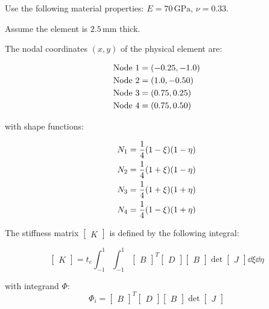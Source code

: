 \documentclass[../main.tex]{subfiles}
\begin{document}
Use the following material properties: \(E=70\,\unit{\giga\pascal}\), \(\nu=0.33\).

Assume the element is \(2.5 \, \unit{\milli\meter}\) thick.

The nodal coordinates \((x,y)\) of the physical element are:

\begin{align*}
    \centering
    \textrm{Node 1} &= (-0.25,-1.0)\\
    \textrm{Node 2} &= (1.0,-0.50)\\
    \textrm{Node 3} &= (0.75,0.25)\\
    \textrm{Node 4} &= (0.75, 0.50)
\end{align*}

with shape functions:

\begin{align*}
    \centering
    N_1 &= \frac{1}{4} (1-\xi)(1-\eta)\\
    N_2 &= \frac{1}{4} (1+\xi)(1-\eta)\\
    N_3 &= \frac{1}{4} (1+\xi)(1+\eta)\\
    N_4 &= \frac{1}{4} (1-\xi)(1+\eta)
\end{align*}

\newpage

\solution{}

The stiffness matrix \(\begin{bmatrix}K\end{bmatrix}\) is defined by the following integral:

\[
    \begin{bmatrix}
        K
    \end{bmatrix}
    =
    t_e
    \int_{-1}^{1} \int_{-1}^{1}
    \begin{bmatrix}
        B
    \end{bmatrix}^T
    \begin{bmatrix}
        D
    \end{bmatrix}
    \begin{bmatrix}
        B
    \end{bmatrix}
    \det
    \begin{bmatrix}
        J
    \end{bmatrix} 
    \dd \xi
    \dd \eta
\]

with integrand \(\Phi\):
\[
    \Phi_i =
    \begin{bmatrix}
        B
    \end{bmatrix}^T
    \begin{bmatrix}
        D
    \end{bmatrix}
    \begin{bmatrix}
        B
    \end{bmatrix}
    \det
    \begin{bmatrix}
        J
    \end{bmatrix}    
\]
\end{document}

